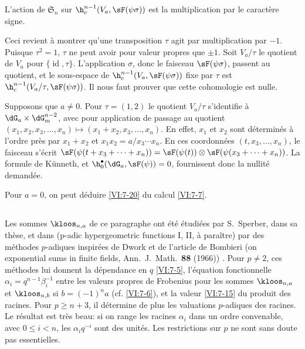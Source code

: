 \begin{proposition_}\label{VI:7-20}
L'action de $\mathfrak{S}_n$ sur $\h_c^{n-1}(V_a,\sF(\psi\sigma))$ est la multiplication 
par le caractère signe. 
\end{proposition_}

Ceci revient à montrer qu'une transposition $\tau$ agit par multiplication 
par $-1$. Puisque $\tau^2=1$, $\tau$ ne peut avoir pour valeur propres que 
$\pm 1$. Soit $V_a/\tau$ le quotient de $V_a$ pour 
$\{\operatorname{id},\tau\}$. L'application $\sigma$, donc le faisceau 
$\sF(\psi\sigma)$, passent au quotient, et le sous-espace de 
$\h_c^{n-1}(V_a,\sF(\psi\sigma))$ fixe par 
$\tau$ est $\h_c^{n-1}(V_a/\tau,\sF(\psi\sigma))$. Il nous faut prouver que 
cette cohomologie est nulle. 

Supposons que $a\ne 0$. Pour $\tau=(1,2)$ le quotient $V_a/\tau$ s'identifie 
à $\dG_a\times \dG_m^{n-2}$, avec pour application de passage au quotient 
$(x_1,x_2,x_3,\dots,x_n)\mapsto (x_1+x_2,x_3,\dots,x_n)$. En effet, $x_1$ et 
$x_2$ sont déterminés 
à l'ordre près par $x_1+x_2$ et 
$x_1x_2 = a/x_3\dotsm x_n$. En ces coordonnées $(t,x_3,\dots,x_n)$, le 
faisceau s'écrit 
$\sF(\psi(t+x_3+\cdots + x_n)) = \sF(\psi(t))\otimes \sF(\psi(x_3+\cdots + x_n))$. 
La formule de K\"unneth, et $\h_0^\bullet(\dG_a,\sF(\psi)) = 0$, fournissent 
donc la nullité demandée. 

Pour $a=0$, on peut déduire \ref{VI:7-20} du calcul \ref{VI:7-7}. 





\subsection{}\label{VI:7-21}

Les sommes $\kloos_{n,a}$ de ce paragraphe ont été étudiées par 
S.\ Sperber, dans sa thèse, et dans (p-adic hypergeometric functions I, II, à paraître) \cite{sp77} par des méthodes 
$p$-adiques inspirées de Dwork et de l'article de Bombieri (on exponential sums in finite fields, Ann.~J.~Math.~\textbf{88} (1966)) \cite{bo66}. 
Pour $p\ne 2$, ces méthodes lui donnent la dépendance en $q$ \ref{VI:7-5}, 
l'équation fonctionnelle $\alpha_i = q^{n-1} \beta_i^{-1}$ entre les 
valeurs propres de Frobenius pour les sommes $\kloos_{n,a}$ et 
$\kloos_{n,b}$ si $b=(-1)^n a$ (cf. \ref{VI:7-6}), et la valeur \ref{VI:7-15} 
du produit des racines. Pour $p\geqslant n+3$, il détermine de plus les 
valuations $p$-adiques des racines. Le résultat est très beau: si on range 
les racines $\alpha_i$ dans un ordre convenable, avec 
$0\leqslant i<n$, les $\alpha_i q^{-i}$ sont des unités. Les 
restrictions sur $p$ ne sont sans doute pas essentielles. 










